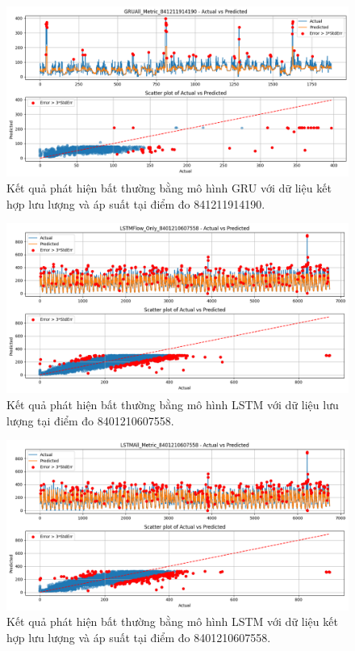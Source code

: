 \begin{figure}[htbp]
    \centering
    \includegraphics[width=\textwidth]{image/section6_3/anomaly_detection_841211914190_gru_allmetric.png}
    \caption{Kết quả phát hiện bất thường bằng mô hình GRU với dữ liệu kết hợp lưu lượng và áp suất tại điểm đo 841211914190.}
    \label{fig:anomaly_gru_841211914190_all}
\end{figure}

\begin{figure}[htbp]
    \centering
    \includegraphics[width=\textwidth]{image/section6_3/anomaly_detection_8401210607558_lstm_flow.png}
    \caption{Kết quả phát hiện bất thường bằng mô hình LSTM với dữ liệu lưu lượng tại điểm đo 8401210607558.}
    \label{fig:anomaly_lstm_8401210607558_flow}
\end{figure}

\begin{figure}[htbp]
    \centering
    \includegraphics[width=\textwidth]{image/section6_3/anomaly_detection_8401210607558_lstm_all_metric.png}
    \caption{Kết quả phát hiện bất thường bằng mô hình LSTM với dữ liệu kết hợp lưu lượng và áp suất tại điểm đo 8401210607558.}
    \label{fig:anomaly_lstm_8401210607558_all}
\end{figure}

